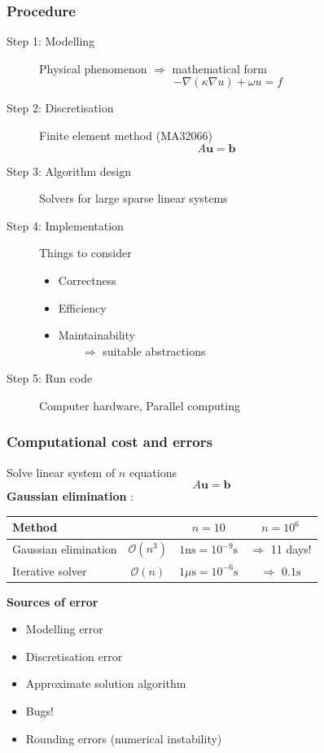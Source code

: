 \documentclass{beamer}
\renewcommand{\vec}[1]{\boldsymbol{#1}}
\begin{document}
\begin{frame}
  \frametitle{Procedure}
  \begin{description}
  \item[Step 1: Modelling] Physical phenomenon $\Rightarrow$ mathematical form
$$
-\nabla(\kappa \nabla u) + \omega u = f
$$
  \item[Step 2: Discretisation] Finite element method (MA32066)
$$
A\boldsymbol{u} = \boldsymbol{b}\qquad
$$
  \item[Step 3: Algorithm design] Solvers for large sparse linear systems
  \item[Step 4: Implementation] Things to consider
  \begin{itemize}
    \item Correctness
    \item Efficiency
    \item Maintainability\\$\qquad\Rightarrow$ suitable abstractions
  \end{itemize}
  \item[Step 5: Run code] Computer hardware, Parallel computing
  \end{description}
\end{frame}


\begin{frame}
  \frametitle{Computational cost and errors}
  Solve linear system of $n$ equations
  $$
  A\vec{u} = \vec{b}
  $$
\textbf{Gaussian elimination} :
\begin{center}
  \begin{tabular}{lccc}
    \hline
    Method & & $n=10$ & $n=10^{6}$\\
    \hline\hline
    Gaussian elimination &  $\mathcal{O}(n^3)$ & $1\text{ns}=10^{-9}\text{s}$ & $\Rightarrow$ 11 days!\\
    Iterative solver & $\mathcal{O}(n)$ & $1\mu\text{s} = 10^{-6}\text{s}$ & $\Rightarrow$ $0.1 \text{s}$\\
    \hline
  \end{tabular}
\end{center}
\vspace{2ex}
\textbf{Sources of error}
\begin{itemize}
\item Modelling error
\item Discretisation error
\item Approximate solution algorithm
\item Bugs!
\item Rounding errors (numerical instability)
\end{itemize}
\end{frame}
\end{document}
